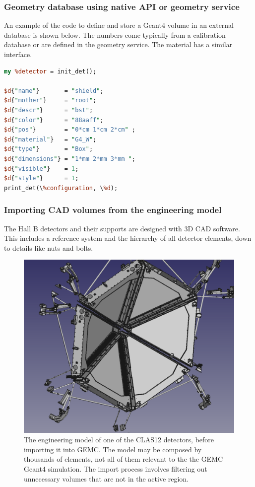 \subsubsection{Geometry database using native API or geometry service}

An example of the code to define and store a Geant4 volume in an external database is shown below. The
numbers come typically from a calibration database or are defined in the geometry service. The material
has a similar interface.

\begin{lstlisting}[language=Perl]
my %detector = init_det();

$d{"name"}       = "shield";
$d{"mother"}     = "root";
$d{"descr"}      = "bst";
$d{"color"}      = "88aaff";
$d{"pos"}        = "0*cm 1*cm 2*cm" ;
$d{"material"}   = "G4_W";
$d{"type"}       = "Box";
$d{"dimensions"} = "1*mm 2*mm 3*mm ";
$d{"visible"}    = 1;
$d{"style"}      = 1;
print_det(\%configuration, \%d);

\end{lstlisting}


\subsubsection{Importing CAD volumes from the engineering model}

The Hall B detectors and their supports are designed with 3D CAD software. This includes a reference system and the
hierarchy of all detector elements, down to details like nuts and bolts.

\begin{figure}[h]
	\centering
	\includegraphics[width=1.0\columnwidth,keepaspectratio]{img/cadSelection.png}
	\caption{The engineering model of one of the CLAS12 detectors, before importing it into GEMC.
             The model may be composed by thousands of elements, not all of them relevant to the the GEMC Geant4 simulation.
             The import process involves filtering out unnecessary volumes that are not in the active region.}
	\label{fig:cadSelection}
\end{figure}

